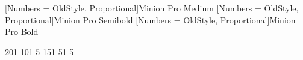 
\usepackage{xspace, xparse, xcolor}

\usepackage[fullfamily, opticals, mathlf, swash, openg, minionint, onlymath]{MinionPro}
\usepackage[protrusion = true, expansion = false]{microtype}
\usepackage{fontspec, ifluatex}
\setmainfont[Numbers = {OldStyle, Proportional}]{Minion Pro}
\setmonofont[Numbers = {Uppercase, Monospaced}]{Minion Pro} %
\newfontface{\mediumface}[Numbers = {OldStyle, Proportional}]{Minion Pro Medium}
\newfontface{\semiboldface}[Numbers = {OldStyle, Proportional}]{Minion Pro Semibold}
\newfontface{\boldface}[Numbers = {OldStyle, Proportional}]{Minion Pro Bold}
\newcommand*{\textbbf}[1]{{\boldface#1}}
\linespread{1.2}

 201 101 5 %
 151 51 5  %

\renewcommand*{\labelenumi}{\textbbf{\roman{enumi}}}
\renewcommand*{\labelitemi}{◆}

\renewcommand*{\pm}{\textup{±}}
\renewcommand*{\approx}{\operatorname{\textup{≈}}}
\renewcommand*{\times}{\operatorname{\textup{×}}}
\renewcommand*{\ldots}{\textup{…}}
\renewcommand*{\prod}{\mathop{\mbox{\LARGE\raisebox{-0.15em}{∏}}}\displaylimits}
\renewcommand*{\coprod}{\mathop{\mbox{\LARGE\raisebox{-0.15em}{\rotatebox[origin=c]{180}{∏}}}}\displaylimits}

\newcommand*{\hodge}{{\textup{\small ✳}}} %
\newcommand*{\leafornamentclosed}{❧}
\ifluatex
\newcommand*{\leafornamentline}{\leafornamentclosed}
\newcommand*{\leafornamentopen}{\leafornamentclosed}
\newcommand*{\lineornament}{—}
\else
\newcommand*{\leafornamentline}{\XeTeXglyph1253}
\newcommand*{\leafornamentopen}{\XeTeXglyph1260}
\newcommand*{\lineornament}{\XeTeXglyph1270}
\fi
\newcommand*{\closewithleafornament}{\begin{center}\vspace{2\parskip}\leafornamentclosed\end{center}}
\newcommand*{\closewithlineornament}{\begin{center}\vspace{2\parskip}\lineornament\end{center}}

